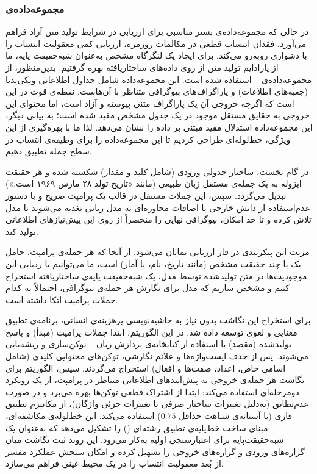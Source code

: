 \subsubsection{مجموعه‌داده‌ی }\label{sec:5-1-2-2}

در حالی که مجموعه‌داده‌ی  بستر مناسبی برای ارزیابی در شرایط تولید متن آزاد فراهم می‌آورد، فقدان انتساب قطعی در مکالمات روزمره، ارزیابی کمی معقولیت انتساب را با دشواری روبه‌رو می‌کند. برای ایجاد یک لنگرگاه مشخص به‌عنوان شبه‌حقیقت پایه، ما از پارادایم تولید متن از روی داده‌های ساختاریافته بهره گرفتیم. بدین‌منظور، از مجموعه‌داده‌ی \href{https://huggingface.co/datasets/michaelauli/wiki_bio}{}~\cite{lebret2016neural} استفاده شده است. این مجموعه‌داده شامل جداول اطلاعاتی ویکی‌پدیا (جعبه‌های اطلاعات) و پاراگراف‌های بیوگرافی متناظر با آن‌هاست. نقطه‌ی قوت  در این است که اگرچه خروجی آن یک پاراگراف متنی پیوسته و آزاد است، اما محتوای این خروجی به حقایق مستقل موجود در یک جدول مشخص مقید شده است؛ به بیانی دیگر، این مجموعه‌داده استدلال مقید مبتنی بر داده را نشان می‌دهد. لذا ما با بهره‌گیری از این ویژگی، خط‌لوله‌ای طراحی کردیم تا این مجموعه‌داده را برای وظیفه‌ی انتساب در سطح جمله تطبیق دهیم. 

در گام نخست، ساختار جدولی ورودی (شامل کلید و مقدار) شکسته شده و هر حقیقت ایزوله به یک جمله‌ی مستقل زبان طبیعی (مانند «تاریخ تولد ۲۸ مارس ۱۹۶۹ است.») تبدیل می‌گردد. سپس، این جملات مستقل در قالب یک پرامپت صریح و با دستور عدم‌استفاده از دانش خارجی یا اضافات محاوره‌ای به مدل زبانی تغذیه می‌شوند تا مدل تلاش کرده و تا حد امکان، بیوگرافی نهایی را منحصراً از روی این پیش‌نیازهای اطلاعاتی تولید کند.

مزیت این پیکربندی در فاز ارزیابی نمایان می‌شود. از آنجا که هر جمله‌ی پرامپت، حامل یک یا چند حقیقت مشخص (مانند تاریخ، نام، یا آمار) است، ما می‌توانیم با ردیابی این موجودیت‌ها در متن تولیدشده توسط مدل، یک شبه‌حقیقت پایه‌ی ساختاریافته استخراج کنیم و مشخص سازیم که مدل برای نگارش هر جمله‌ی بیوگرافی، احتمالاً به کدام جملات پرامپت اتکا داشته است.

برای استخراج این نگاشت بدون نیاز به حاشیه‌نویسی پرهزینه‌ی انسانی، برنامه‌ی تطبیق معنایی و لغوی توسعه داده شد. در این الگوریتم، ابتدا جملات پرامپت (مبدأ) و پاسخ تولیدشده (مقصد) با استفاده از کتابخانه‌ی پردازش زبان ~\cite{honnibal2017spacy} توکن‌سازی و ریشه‌یابی می‌شوند. پس از حذف ایست‌واژه‌ها و علائم نگارشی، توکن‌های محتوایی کلیدی (شامل اسامی خاص، اعداد، صفت‌ها و افعال) استخراج می‌گردند. سپس، الگوریتم برای نگاشت هر جمله‌ی خروجی به پیش‌آیندهای اطلاعاتی متناظر در پرامپت، از یک رویکرد دومرحله‌ای استفاده می‌کند: ابتدا از اشتراک قطعی توکن‌ها بهره می‌برد و در صورت عدم‌تطابق (به‌دلیل تغییرات ساختار صرفی یا تغییرات جزئی واژگان)، از مکانیزم تطبیق فازی (با آستانه‌ی شباهت حداقل $0.75$) استفاده می‌کند. این خط‌لوله‌ی مکاشفه‌ای، مبنای ساخت خط‌پایه‌ی تطبیق رشته‌ای () را تشکیل می‌دهد که به‌عنوان یک شبه‌حقیقت‌پایه برای اعتبارسنجی اولیه به‌کار می‌رود. این روند ثبت نگاشت میان گزاره‌های ورودی و گزاره‌های خروجی را تسهیل کرده و امکان سنجش عملکرد مفسر از بُعد معقولیت انتساب را در یک محیط عینی فراهم می‌سازد.

